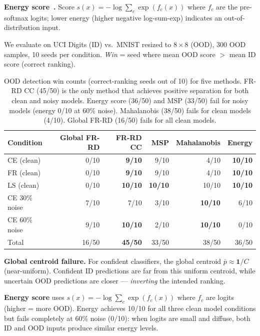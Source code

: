 \documentclass[11pt]{article}
\begin{document}
\textbf{Energy score~\citep{liu2020energy}.} Score $s(x) = -\log\sum_c \exp(f_c(x))$
where $f_c$ are the pre-softmax logits; lower energy (higher negative log-sum-exp) indicates
an out-of-distribution input.

We evaluate on UCI Digits (ID) vs.\ MNIST resized to $8\times 8$ (OOD),
300 OOD samples, 10 seeds per condition.
\emph{Win} = seed where mean OOD score $>$ mean ID score (correct ranking).

\begin{table}[h]
  \centering
  \caption{OOD detection win counts (correct-ranking seeds out of 10) for five methods.
  FR-RD CC (45/50) is the only method that achieves positive separation for both clean
  and noisy models. Energy score (36/50) and MSP (33/50) fail for noisy models (energy
  0/10 at 60\% noise). Mahalanobis (38/50) fails for clean models (4/10). Global FR-RD
  (16/50) fails for all clean models.}
  \label{tab:ood}
  \small
  \begin{tabular}{lrrrrr}
    \toprule
    Condition & Global FR-RD & FR-RD CC & MSP & Mahalanobis & Energy \\
    \midrule
    CE (clean)    & 0/10 & \textbf{9/10} & 9/10        & 4/10  & \textbf{10/10} \\
    FR (clean)    & 0/10 & \textbf{9/10} & 9/10        & 4/10  & \textbf{10/10} \\
    LS (clean)    & 0/10 & \textbf{10/10}& \textbf{10/10} & 10/10& \textbf{10/10} \\
    CE 30\% noise & 7/10 & 7/10          & 3/10        & \textbf{10/10} & 6/10 \\
    CE 60\% noise & 9/10 & \textbf{10/10}& 2/10        & \textbf{10/10} & 0/10 \\
    \midrule
    Total         & 16/50 & \textbf{45/50} & 33/50 & 38/50 & 36/50 \\
    \bottomrule
  \end{tabular}
\end{table}

\textbf{Global centroid failure.} For confident classifiers, the global centroid
$\bar{p} \approx \mathbf{1}/C$ (near-uniform). Confident ID predictions are far from
this uniform centroid, while uncertain OOD predictions are closer — \emph{inverting}
the intended ranking.

\textbf{Energy score} \citep{liu2020energy} uses $s(x) = -\log\sum_c \exp(f_c(x))$ where
$f_c$ are logits (higher = more OOD). Energy achieves 10/10 for all three clean model conditions but fails
completely at 60\% noise (0/10): when logits are small and diffuse, both ID and OOD
inputs produce similar energy levels.
\end{document}
